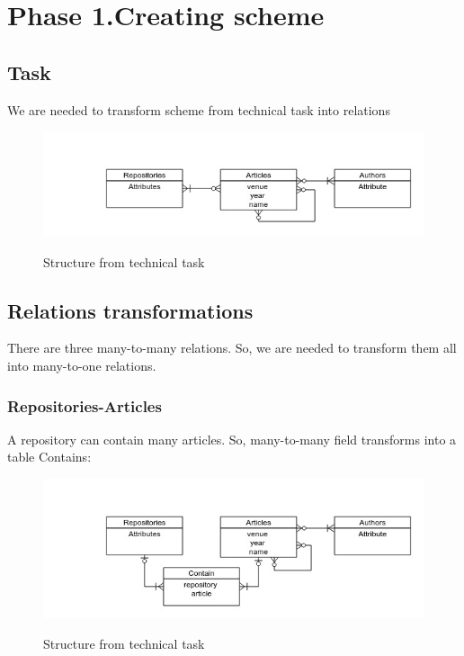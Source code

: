 \documentclass[12pt,a4paper]{article}
\begin{document}
\section{Phase 1.Creating scheme}
\subsection{Task}
We are needed to transform scheme from technical task into relations
\begin{figure}[h!]
\includegraphics[scale=0.65791]{media/figure1.jpg}\\
\caption{Structure from technical task}
\end{figure}

\subsection{Relations transformations}
There are three many-to-many relations. So, we are needed to transform them all into many-to-one relations.
\subsubsection{Repositories-Articles}
A repository can contain many articles. So, many-to-many field transforms into a table Contains:\\
\begin{figure}[h!]
\includegraphics[scale=0.65791]{media/figure2.jpg}\\
\caption{Structure from technical task}
\end{figure}
\end{document}
